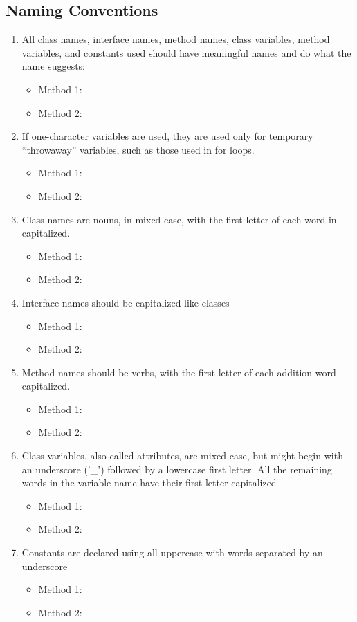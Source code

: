 \subsection{Naming Conventions}
\begin{enumerate}
\setcounter{enumi}{0}
	\item All class names, interface names, method names, class variables, method variables, and constants used should have meaningful names and do what the name suggests:
	\begin{itemize}
	 	\item Method 1: \cmark
		 \item Method 2: \cmark
	\end{itemize}
	\item If one-character variables are used, they are used only for temporary ``throwaway'' variables, such as those used in for loops.
	\begin{itemize}
	 	\item Method 1: \cmark
	 \item Method 2: \cmark
	\end{itemize}
	\item Class names are nouns, in mixed case, with the first letter of each word in capitalized.
	\begin{itemize}
	 	\item Method 1: \cmark
 		\item Method 2: \cmark
	\end{itemize}
	\item Interface names should be capitalized like classes
	\begin{itemize}
	 	\item Method 1: \cmark
 		\item Method 2: \cmark
	\end{itemize}	
	\item Method names should be verbs, with the first letter of each addition word capitalized.
	\begin{itemize}
	 	\item Method 1: \cmark
 		\item Method 2: \cmark
	\end{itemize}
	\item Class variables, also called attributes, are mixed case, but might begin with an underscore
	('\_') followed by a lowercase first letter. All the remaining words in the variable name have
	their first letter capitalized
	\begin{itemize}
	 	\item Method 1: \cmark
 		\item Method 2: \cmark
	\end{itemize}
	\item Constants are declared using all uppercase with words separated by an underscore
	\begin{itemize}
	 	\item Method 1: \cmark
 		\item Method 2: \cmark
	\end{itemize}	
\end{enumerate}